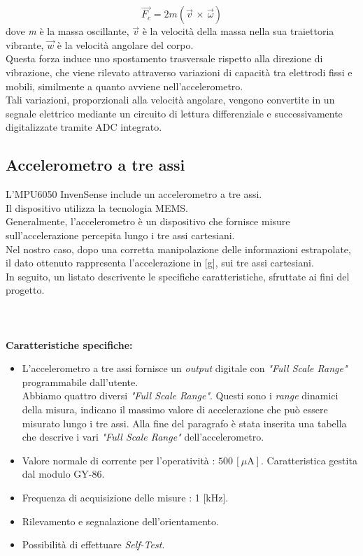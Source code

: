 \documentclass[11pt]{report}
\begin{document}
\begin{equation}
    \vec{F_c} = 2m(\vec{v}\,\times \,\vec\omega )
\end{equation}
dove \textit{m} è la massa oscillante, $\vec{v}$ è la velocità della massa nella sua traiettoria vibrante, $\vec{w}$ è la velocità angolare del corpo.\\
Questa forza induce uno spostamento trasversale rispetto alla direzione di vibrazione, che viene rilevato attraverso variazioni di capacità tra elettrodi fissi e mobili, similmente a quanto avviene nell'accelerometro.\\
Tali variazioni, proporzionali alla velocità angolare, vengono convertite in un segnale elettrico mediante un circuito di lettura differenziale e successivamente digitalizzate tramite ADC integrato.
\subsection{Accelerometro a tre assi}
L'MPU6050 InvenSense include un accelerometro a tre assi.\\
Il dispositivo utilizza la tecnologia MEMS.\\
Generalmente, l'accelerometro è un dispositivo che fornisce misure sull'accelerazione percepita lungo i tre assi cartesiani.\\
Nel nostro caso, dopo una corretta manipolazione delle informazioni estrapolate, il dato ottenuto rappresenta l'accelerazione in [g], sui tre assi cartesiani.\\
In seguito, un listato descrivente le specifiche caratteristiche, sfruttate ai fini del progetto.\\\\\\\\
\textbf{Caratteristiche specifiche:}
\begin{itemize}
\item L'accelerometro a tre assi fornisce un \textit{output} digitale con \textit{"Full Scale Range"} programmabile dall'utente.\\ Abbiamo quattro diversi \textit{"Full Scale Range"}. Questi sono i \textit{range} dinamici della misura, indicano il massimo valore di accelerazione che può essere misurato lungo i tre assi. Alla fine del paragrafo è stata inserita una tabella che descrive i vari \textit{"Full Scale Range"} dell'accelerometro. 
\item Valore normale di corrente per l'operatività : $500\,[\mu\text{A}]$. Caratteristica gestita dal modulo GY-86.
\item Frequenza di acquisizione delle misure : 1 [kHz].
\item Rilevamento e segnalazione dell'orientamento.
\item Possibilità di effettuare \textit{Self-Test}.
\end{itemize}
\end{document}

